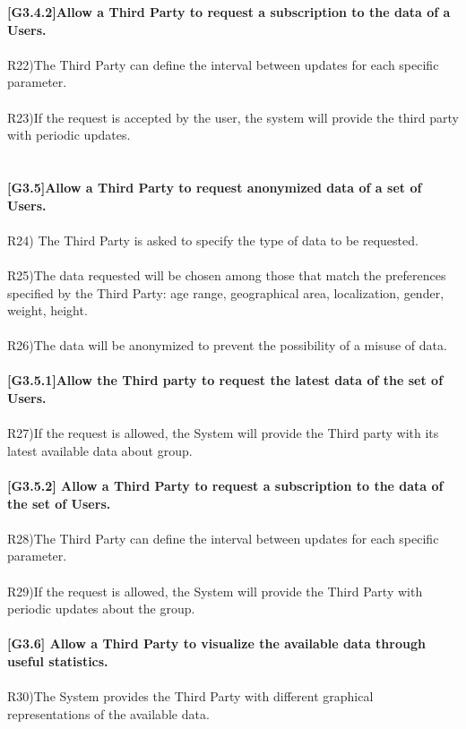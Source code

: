 \textbf{[G3.4.2]Allow a Third Party to request a subscription to the data of a Users.} \\ \\
R22)The Third Party can define the interval between updates for each specific parameter. \\ \\
R23)If the request is accepted by the user, the system will provide the third party with periodic updates. \\ \\ \\

\textbf{[G3.5]Allow a Third Party to request anonymized data of a set of Users.} \\ \\
R24) The Third Party is asked to specify the type of data to be requested. \\ \\
R25)The data requested will be chosen among those that match the preferences specified by the Third Party: age range, geographical area, localization, gender, weight, height. \\ \\
R26)The data will be anonymized to prevent the possibility of a misuse of data. \\ \\ 

\textbf{[G3.5.1]Allow the Third party to request the latest data of the set of Users.} \\ \\
R27)If the request is allowed, the System will provide the Third party with its latest available data about group. \\ \\

\textbf{[G3.5.2] Allow a Third Party to request a subscription to the data of the set of Users.} \\ \\
R28)The Third Party can define the interval between updates for each specific parameter. \\ \\
R29)If the request is allowed, the System will provide the Third Party with periodic updates about the group. \\ \\ 

\textbf{[G3.6] Allow a Third Party to visualize the available data through useful statistics.} \\ \\
R30)The System provides the Third Party with different graphical representations of the available data. \\ \\

